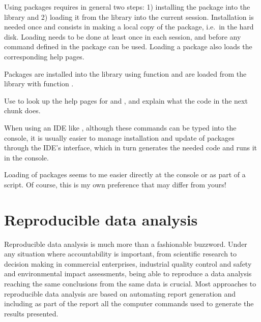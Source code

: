 \documentclass[krantz2]{krantz}\usepackage{knitr}%
\begin{document}
Using packages requires in general two steps: 1) installing the package into the \Rpgrm library and 2) loading it from the library into the current \Rpgrm session. Installation is needed once and consists in making a local copy of the package, i.e.\ in the hard disk. Loading needs to be done at least once in each \Rpgrm session, and before any command defined in the package can be used. Loading a package also loads the corresponding help pages.

Packages are installed into the library using function  and are loaded from the library with function .

\begin{playground}
Use  to look up the help pages for  and , and explain what the code in the next chunk does.

\begin{knitrout}\footnotesize
{}\color{fgcolor}\begin{kframe}
\begin{alltt}
 \hlkwb{=} 
\hlstd{(}\hlopt{!}  \hlstd{=} \hlstd{)) \{}
\hlstd{\}}
  \hlstd{=} \hlstd{)}
\end{alltt}
\end{kframe}
\end{knitrout}
\end{playground}

When using an IDE like \RStudio, although these commands can be typed into the \Rpgrm console, it is usually easier to manage installation and update of packages through the IDE's interface, which in turn generates the needed \Rlang code and runs it in the console.

Loading of packages seems to me easier directly at the console or as part of a script. Of course, this is my own preference that may differ from yours!

\section{Reproducible data analysis}
Reproducible data analysis is much more than a fashionable buzzword. Under any situation where accountability is important, from scientific research to decision making in commercial enterprises, industrial quality control and safety and environmental impact assessments, being able to reproduce a data analysis reaching the same conclusions from the same data is crucial. Most approaches to reproducible data analysis are based on automating report generation and including as part of the report all the computer commands used to generate the results presented.
\end{document}

